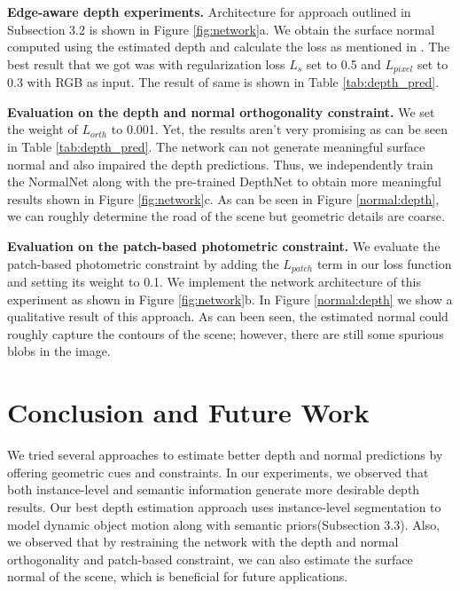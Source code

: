 \documentclass[10pt,twocolumn,letterpaper]{article}
\begin{document}
\noindent \textbf{Edge-aware depth experiments.}
Architecture for approach outlined in Subsection 3.2 is shown in Figure \ref{fig:network}a. We obtain the surface normal computed using the estimated depth and calculate the loss as mentioned in \cite{yang2017unsupervised}. The best result that we got was with regularization loss $L_s$ set to 0.5 and $L_{pixel}$ set to 0.3 with RGB as input. The result of same is shown in Table \ref{tab:depth_pred}.

\noindent \textbf{Evaluation on the depth and normal orthogonality constraint.}
We set the weight of $L_{orth}$ to 0.001. Yet, the results aren't very promising as can be seen in Table \ref{tab:depth_pred}. The network can not generate meaningful surface normal and also impaired the depth predictions. Thus, we independently train the NormalNet along with the pre-trained DepthNet to obtain more meaningful results shown in Figure \ref{fig:network}c. As can be seen in Figure \ref{normal:depth}, we can roughly determine the road of the scene but geometric details are coarse.

\noindent \textbf{Evaluation on the patch-based photometric constraint.}
We evaluate the patch-based photometric constraint by adding the $L_{patch}$ term in our loss function and setting its weight to 0.1. We implement the network architecture of this experiment as shown in Figure \ref{fig:network}b. In Figure \ref{normal:depth} we show a qualitative result of this approach. As can been seen, the estimated normal could roughly capture the contours of the scene; however, there are still some spurious blobs in the image. 

\section{Conclusion and Future Work}

We tried several approaches to estimate better depth and normal predictions by offering geometric cues and constraints. In our experiments, we observed that both instance-level and semantic information generate more desirable depth results. Our best depth estimation approach uses instance-level segmentation to model dynamic object motion along with semantic priors(Subsection 3.3). Also, we observed that by restraining the network with the depth and normal orthogonality and patch-based constraint, we can also estimate the surface normal of the scene, which is beneficial for future applications. 
\end{document}
